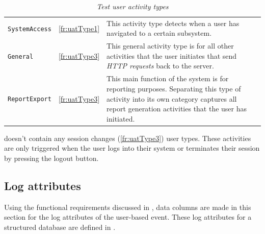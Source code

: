 \begin{table}[!htb]
	\centering
	\caption[Test user activity types]{\textit{Test user activity types}}
	\label{tbl:ch3_testActivityTypes}
	\begin{tabularx}{\textwidth}{llX}
		\toprule
		\thead{Activity} & \thead{Functional requirement} & \thead{Description} \\
		\midrule
		\rowcolor{lightgray}
		\texttt{SystemAccess} & \ref{fr:uatType1} & \RaggedRight This activity type detects when a user has navigated to a certain subsystem. \\ 
		\texttt{General} & \ref{fr:uatType3} & \RaggedRight This general activity type is for all other activities that the user initiates that send \textit{HTTP requests} back to the server. \\
		\rowcolor{lightgray}
		\texttt{ReportExport} & \ref{fr:uatType3} & \RaggedRight This main function of the system is for reporting purposes. Separating this type of activity into its own category captures all report generation activities that the user has initiated. \\ 
		\bottomrule
	\end{tabularx}
\end{table}

 doesn't contain any session changes (\ref{fr:uatType3}) user types. These activities are only triggered when the user logs into their system or terminates their session by pressing the logout button.

\subsection{Log attributes}\label{sec:ch3_implementationLogAtrributes}
Using the functional requirements discussed in , data columns are made in this section for the log attributes of the user-based event. These log attributes for a structured database are defined in . 

